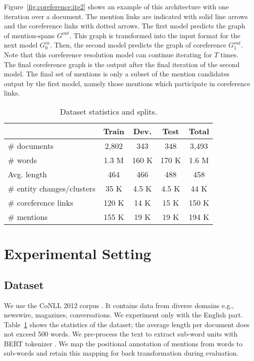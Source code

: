 \documentclass[11pt]{article}
\begin{document}
Figure~\ref{fig:coreference:ite2} shows an example of this architecture with one iteration over a document. The mention links are indicated with solid line arrows and the coreference links with dotted arrows. The first model predicts the graph of mention-spans $G^{out}$. This graph is transformed into the input format for the next model $G^{in}_0$. Then, the second model predicts the graph of coreference $G_1^{out}$. Note that this coreference resolution model can continue iterating for $T$ times. The final coreference graph is the output after the final iteration of the second model.  The final set of mentions is only a subset of the mention candidates output by the first model, namely those mentions which participate in coreference links.




\begin{table}
	\centering
	\begin{adjustbox}{width=\linewidth}
	\begin{tabular}{l c c c c} 
		\toprule
		& \textbf{Train} &  \textbf{Dev.} &  \textbf{Test} &  \textbf{Total} \\ \hline			
		\# documents & 2,802 & 343& 348 & 3,493\\
		\# words  & 1.3 M & 160 K& 170 K & 1.6 M\\
		Avg. length  & 464 & 466 & 488 & 458 \\ \hline	
		\# entity changes/clusters & 35 K & 4.5 K & 4.5 K & 44 K   \\
		\# coreference links & 120 K & 14 K & 15 K & 150 K  \\
		\# mentions & 155 K & 19 K & 19 K & 194 K   \\
		\bottomrule
	\end{tabular} 
	\end{adjustbox}
	\caption{Dataset statistics and splits.}
	\label{tab:coreference:data}
\end{table}






\section{Experimental Setting} 
\label{sec:coreference:experiments}


\subsection{Dataset}
We use the CoNLL 2012 corpus \cite{pradhan-etal-2012-conll}. It contains data from diverse domains e.g., newswire, magazines, conversations.  We experiment only with the English part. Table~\ref{tab:coreference:data} shows the statistics of the dataset; the average length per document does not exceed 500 words. We pre-process the text to extract sub-word units \cite{sennrich-etal-2016-neural} with BERT tokenizer \cite{wu2016google}. We map the positional annotation of mentions from words to sub-words and retain this mapping for back transformation during evaluation. 
\end{document}
